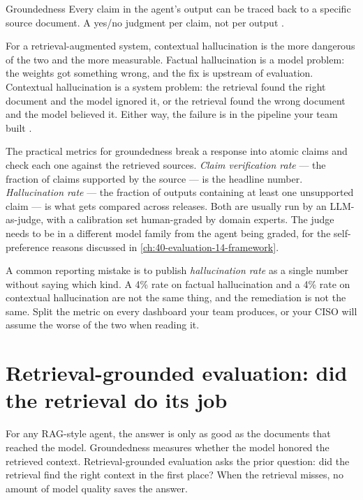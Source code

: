 \begin{TNdefinition}{Groundedness}
Every claim in the agent's output can be traced back to a specific source document. A yes/no judgment per claim, not per output \citep{shuster2021groundedness, asai2023selfrag}.
\end{TNdefinition}

For a retrieval-augmented system, contextual hallucination is the more dangerous of the two and the more measurable. Factual hallucination is a model problem: the weights got something wrong, and the fix is upstream of evaluation. Contextual hallucination is a system problem: the retrieval found the right document and the model ignored it, or the retrieval found the wrong document and the model believed it. Either way, the failure is in the pipeline your team built \citep{huang2023hallucination-survey}.

The practical metrics for groundedness break a response into atomic claims and check each one against the retrieved sources. \textit{Claim verification rate} --- the fraction of claims supported by the source --- is the headline number. \textit{Hallucination rate} --- the fraction of outputs containing at least one unsupported claim --- is what gets compared across releases. Both are usually run by an LLM-as-judge, with a calibration set human-graded by domain experts. The judge needs to be in a different model family from the agent being graded, for the self-preference reasons discussed in \autoref{ch:40-evaluation-14-framework}.

\begin{TNwarning}
A common reporting mistake is to publish \textit{hallucination rate} as a single number without saying which kind. A 4\% rate on factual hallucination and a 4\% rate on contextual hallucination are not the same thing, and the remediation is not the same. Split the metric on every dashboard your team produces, or your CISO will assume the worse of the two when reading it.
\end{TNwarning}

\section{Retrieval-grounded evaluation: did the retrieval do its job}

For any RAG-style agent, the answer is only as good as the documents that reached the model. Groundedness measures whether the model honored the retrieved context. Retrieval-grounded evaluation asks the prior question: did the retrieval find the right context in the first place? When the retrieval misses, no amount of model quality saves the answer.

